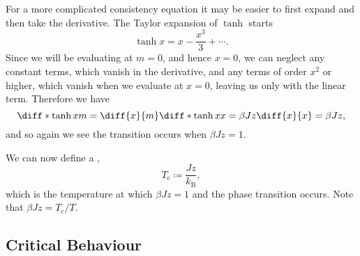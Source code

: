 \documentclass[fleqn]{NotesClass}
\newcommand*{\boltzmann}{k_{\mathrm{B}}}
\begin{document}
    For a more complicated consistency equation it may be easier to first expand and then take the derivative.
    The Taylor expansion of \(\tanh\) starts
    \begin{equation}
        \tanh x = x - \frac{x^3}{3} + \dotsb.
    \end{equation}
    Since we will be evaluating at \(m = 0\), and hence \(x = 0\), we can neglect any constant terms, which vanish in the derivative, and any terms of order \(x^2\) or higher, which vanish when we evaluate at \(x = 0\), leaving us only with the linear term.
    Therefore we have
    \begin{equation}
        \diff*{\tanh x}{m} = \diff{x}{m}\diff*{\tanh x}{x} = \beta Jz \diff{x}{x} = \beta Jz,
    \end{equation}
    and so again we see the transition occurs when \(\beta Jz = 1\).
    
    We can now define a ,
    \begin{equation}
        T_{\mathrm{c}} \coloneqq \frac{Jz}{\boltzmann},
    \end{equation}
    which is the temperature at which \(\beta Jz = 1\) and the phase transition occurs.
    Note that \(\beta Jz = T_{\mathrm{c}} / T\).
    
    \subsection{Critical Behaviour}
\end{document}

